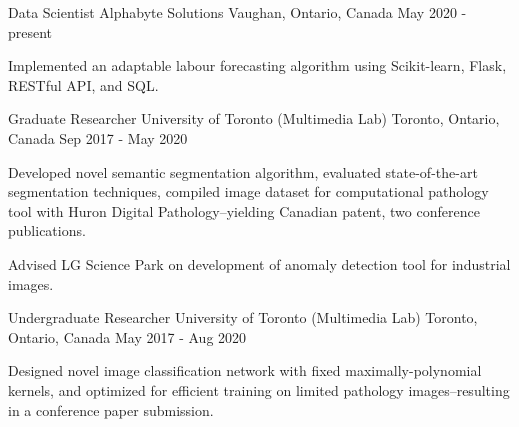 

\begin{cventries}

  \cventry
    {Data Scientist} %
    {Alphabyte Solutions} %
    {Vaughan, Ontario, Canada} %
    {May 2020 - present} %
    {
      \begin{cvitems} %
        \item {Implemented an adaptable labour forecasting algorithm using Scikit-learn, Flask, RESTful API, and SQL.}
      \end{cvitems}
    }

  \cventry
    {Graduate Researcher} %
    {University of Toronto (Multimedia Lab)} %
    {Toronto, Ontario, Canada} %
    {Sep 2017 - May 2020} %
    {
      \begin{cvitems} %
        \item {Developed novel semantic segmentation algorithm, evaluated state-of-the-art segmentation techniques, compiled image dataset for computational pathology tool with Huron Digital Pathology--yielding Canadian patent, two conference publications.}
        \item {Advised LG Science Park on development of anomaly detection tool for industrial images.}
      \end{cvitems}
    }

  \cventry
    {Undergraduate Researcher} %
    {University of Toronto (Multimedia Lab)} %
    {Toronto, Ontario, Canada} %
    {May 2017 - Aug 2020} %
    {
      \begin{cvitems} %
        \item {Designed novel image classification network with fixed maximally-polynomial kernels, and optimized for efficient training on limited pathology images--resulting in a conference paper submission.}
      \end{cvitems}
    }
		

\end{cventries}
